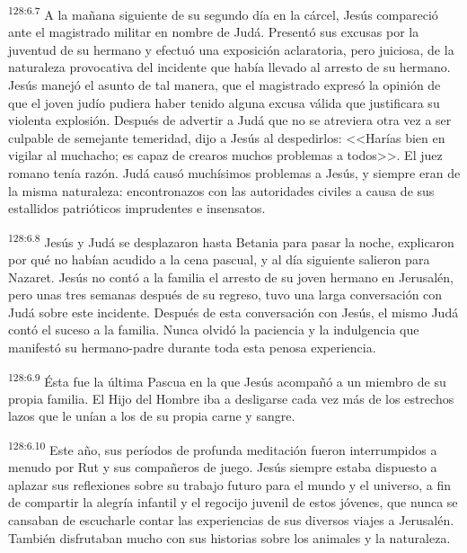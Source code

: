 \par 
\textsuperscript{128:6.7} A la mañana siguiente de su segundo día en la cárcel, Jesús compareció ante el magistrado militar en nombre de Judá. Presentó sus excusas por la juventud de su hermano y efectuó una exposición aclaratoria, pero juiciosa, de la naturaleza provocativa del incidente que había llevado al arresto de su hermano. Jesús manejó el asunto de tal manera, que el magistrado expresó la opinión de que el joven judío pudiera haber tenido alguna excusa válida que justificara su violenta explosión. Después de advertir a Judá que no se atreviera otra vez a ser culpable de semejante temeridad, dijo a Jesús al despedirlos: <<Harías bien en vigilar al muchacho; es capaz de crearos muchos problemas a todos>>. El juez romano tenía razón. Judá causó muchísimos problemas a Jesús, y siempre eran de la misma naturaleza: encontronazos con las autoridades civiles a causa de sus estallidos patrióticos imprudentes e insensatos.

\par 
\textsuperscript{128:6.8} Jesús y Judá se desplazaron hasta Betania para pasar la noche, explicaron por qué no habían acudido a la cena pascual, y al día siguiente salieron para Nazaret. Jesús no contó a la familia el arresto de su joven hermano en Jerusalén, pero unas tres semanas después de su regreso, tuvo una larga conversación con Judá sobre este incidente. Después de esta conversación con Jesús, el mismo Judá contó el suceso a la familia. Nunca olvidó la paciencia y la indulgencia que manifestó su hermano-padre durante toda esta penosa experiencia.

\par 
\textsuperscript{128:6.9} Ésta fue la última Pascua en la que Jesús acompañó a un miembro de su propia familia. El Hijo del Hombre iba a desligarse cada vez más de los estrechos lazos que le unían a los de su propia carne y sangre.

\par 
\textsuperscript{128:6.10} Este año, sus períodos de profunda meditación fueron interrumpidos a menudo por Rut y sus compañeros de juego. Jesús siempre estaba dispuesto a aplazar sus reflexiones sobre su trabajo futuro para el mundo y el universo, a fin de compartir la alegría infantil y el regocijo juvenil de estos jóvenes, que nunca se cansaban de escucharle contar las experiencias de sus diversos viajes a Jerusalén. También disfrutaban mucho con sus historias sobre los animales y la naturaleza.

